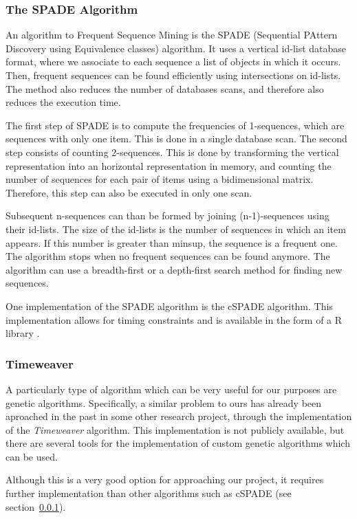 \subsubsection{The SPADE Algorithm}
\label{sec:the_spade_algorithm}
An algorithm to Frequent Sequence Mining is the SPADE\cite{zaki2001spade} (Sequential PAttern Discovery using Equivalence classes) algorithm. It uses a vertical id-list database format, where we associate to each sequence a list of objects in which it occurs. Then, frequent sequences can be found efficiently using intersections on id-lists. The method also reduces the number of databases scans, and therefore also reduces the execution time.

The first step of SPADE is to compute the frequencies of 1-sequences, which are sequences with only one item. This is done in a single database scan. The second step consists of counting 2-sequences. This is done by transforming the vertical representation into an horizontal representation in memory, and counting the number of sequences for each pair of items using a bidimensional matrix. Therefore, this step can also be executed in only one scan.

Subsequent n-sequences can than be formed by joining (n-1)-sequences using their id-lists. The size of the id-lists is the number of sequences in which an item appears. If this number is greater than minsup, the sequence is a frequent one. The algorithm stops when no frequent sequences can be found anymore. The algorithm can use a breadth-first or a depth-first search method for finding new sequences.

One implementation of the SPADE algorithm is the cSPADE algorithm. This implementation allows for timing constraints and is available in the form of a R library \cite{zaki2000cspade}.

\subsubsection{Timeweaver}
A particularly type of algorithm which can be very useful for our purposes are genetic algorithms\cite{goldberg1989genetic}. Specifically, a similar problem to ours has already been aproached in the past in some other research project, through the implementation of the \emph{Timeweaver} algorithm\cite{weiss1999timeweaver}. This implementation is not publicly available, but there are several tools for the implementation of custom genetic algorithms which can be used.

Although this is a very good option for approaching our project, it requires further implementation than other algorithms such as cSPADE (see section~\ref{sec:the_spade_algorithm}).

